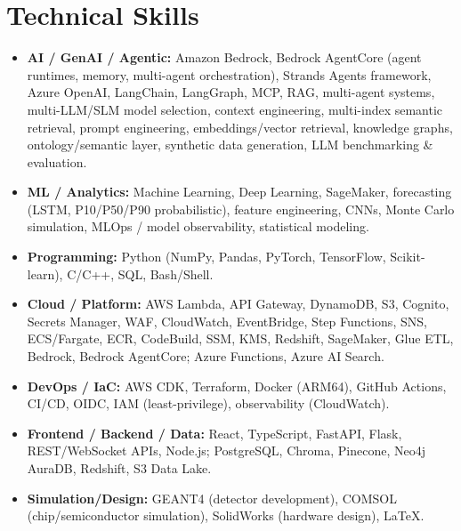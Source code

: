 \documentclass[a4paper,10pt]{article}
\begin{document}
\section{Technical Skills}
\begin{itemize}[leftmargin=0.5cm]
  \item \textbf{AI / GenAI / Agentic:} Amazon Bedrock, Bedrock AgentCore (agent runtimes, memory, multi-agent orchestration), Strands Agents framework, Azure OpenAI, LangChain, LangGraph, MCP, RAG, multi-agent systems, multi-LLM/SLM model selection, context engineering, multi-index semantic retrieval, prompt engineering, embeddings/vector retrieval, knowledge graphs, ontology/semantic layer, synthetic data generation, LLM benchmarking \& evaluation.
  \item \textbf{ML / Analytics:} Machine Learning, Deep Learning, SageMaker, forecasting (LSTM, P10/P50/P90 probabilistic), feature engineering, CNNs, Monte Carlo simulation, MLOps / model observability, statistical modeling.
  \item \textbf{Programming:} Python (NumPy, Pandas, PyTorch, TensorFlow, Scikit-learn), C/C++, SQL, Bash/Shell.
  \item \textbf{Cloud / Platform:} AWS Lambda, API Gateway, DynamoDB, S3, Cognito, Secrets Manager, WAF, CloudWatch, EventBridge, Step Functions, SNS, ECS/Fargate, ECR, CodeBuild, SSM, KMS, Redshift, SageMaker, Glue ETL, Bedrock, Bedrock AgentCore; Azure Functions, Azure AI Search.
  \item \textbf{DevOps / IaC:} AWS CDK, Terraform, Docker (ARM64), GitHub Actions, CI/CD, OIDC, IAM (least-privilege), observability (CloudWatch).
  \item \textbf{Frontend / Backend / Data:} React, TypeScript, FastAPI, Flask, REST/WebSocket APIs, Node.js; PostgreSQL, Chroma, Pinecone, Neo4j AuraDB, Redshift, S3 Data Lake.
  \item \textbf{Simulation/Design:} GEANT4 (detector development), COMSOL (chip/semiconductor simulation), SolidWorks (hardware design), LaTeX.
\end{itemize}
\end{document}
